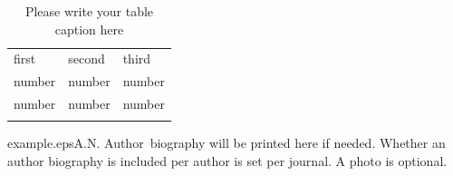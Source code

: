 %
\begin{table}[t]
\caption{Please write your table caption here}
\centering
\label{tab:1}       %
\begin{tabular}{lll}
\hline\noalign{\smallskip}
first & second & third  \\[3pt]
\tableheadseprule\noalign{\smallskip}
number & number & number \\
number & number & number \\
\noalign{\smallskip}\hline
\end{tabular}
\end{table}





%
%

\begin{authorbiography}{example.eps}{A.N. Author}\
biography will be printed here if needed. Whether an author
biography is included per author is set
per journal. A photo is optional.
\end{authorbiography}


